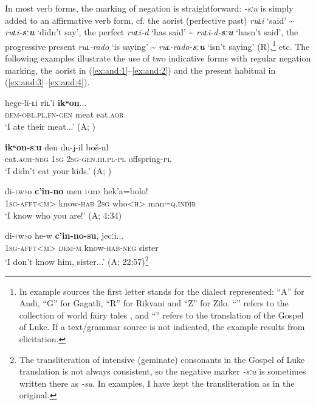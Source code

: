 \documentclass[output=paper,colorlinks=true, citecolor=brown]{langscibook}
\begin{document}
\largerpage
In most verb forms, the marking of negation is straightforward: \textit{{}-sːu} is simply added to an affirmative verb form, cf. the aorist (perfective past) \textit{ruʟi} ‘said’ {\textasciitilde} \textit{ruʟi-}\textbf{\textit{sːu}} ‘didn’t say’, the perfect \textit{ruʟi-d} ‘has said’ {\textasciitilde} \textit{ruʟi-d-}\textbf{\textit{sːu}} ‘hasn’t said’, the progressive present \textit{ruʟ-rado} ‘is saying’ {\textasciitilde} \textit{ruʟ-rado-}\textbf{\textit{sːu}} ‘isn’t saying’ (R),\footnote{In example sources the first letter stands for the dialect represented: “A” for Andi, “G” for Gagatli, “R” for Rikvani and “Z” for Zilo. “” refers to the collection of world fairy tales \citep{Tales}, and “” refers to the translation of the Gospel of Luke. If a text/grammar source is not indicated, the example results from elicitation.} etc. The following examples illustrate the use of two indicative forms with regular negation marking, the aorist in (\ref{ex:and:1}–\ref{ex:and:2}) and the present habitual in (\ref{ex:and:3}–\ref{ex:and:4}).

\ea 
    \label{ex:and:1}
    \gll  hege{}-li{}-ʟi riʟ’i \textbf{ikʷon}...\\
          \textsc{dem-obl.pl.fn{}-gen} meat eat.\textsc{aor}\\
     ‘I ate their meat...’ (A; )
\z 

\ea
    \label{ex:and:2}
    \gll \textbf{ikʷon{}-sːu} den du{}-j{}-il boš{}-ul\\
         eat.\textsc{aor-neg} \textsc{1sg} \textsc{2sg}{}-\textsc{gen.iii.pl-pl} offspring{}-\textsc{pl}\\
     ‘I didn’t eat your kids.’ (A; )
\z

\ea
    \label{ex:and:3}
    \gll di{}-‹w›o \textbf{c’in{}-no} men i‹m› hek’a=bolo!\\
          \textsc{1sg}-\textsc{afft<m>} know-\textsc{hab} \textsc{2sg} who<\textsc{h>} man=\textsc{q.indir}\\
    \glt ‘I know who you are!’ (A;  4:34)
\z 

\ea\label{ex:and:4} 
    \gll di-‹w›o he{}-w \textbf{c’in{}-no{}-su}, jecːi...  \\ 
          \textsc{1sg}-\textsc{afft<m>} \textsc{dem-m} know-\textsc{hab-neg} sister \\
    \glt ‘I don’t know him, sister...’ (A;  22:57)\footnote{The transliteration of intensive (geminate) consonants in the Gospel of Luke translation is not always consistent, so the negative marker \textit{{}-sːu} is sometimes written there as \textit{{}-su}. In examples, I have kept the transliteration as in the original.}  
\z 
\end{document}
